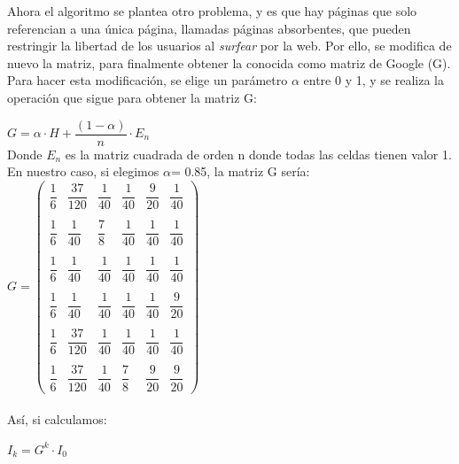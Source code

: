\documentclass[a4paper]{article}
\begin{document}
Ahora el algoritmo se plantea otro problema, y es que hay páginas que solo referencian a una única página, llamadas páginas absorbentes, que pueden restringir la libertad de los usuarios al \textit{surfear} por la web. Por ello, se modifica de nuevo la matriz, para finalmente obtener la conocida como matriz de Google (G).\\

Para hacer esta modificación, se elige un parámetro $\alpha$ entre 0 y 1, y se realiza la operación que sigue para obtener la matriz G:


\hspace{5cm}$G=\alpha \cdot H + \dfrac{(1-\alpha)}{n} \cdot E_n$\\

Donde $E_n$ es la matriz cuadrada de orden n donde todas las celdas tienen valor 1.\\

En nuestro caso, si elegimos $\alpha$= 0.85, la matriz G sería:\\


\hspace{5cm}$G=\begin{pmatrix}
   \dfrac{1}{6} & \dfrac{37}{120} & \dfrac{1}{40} & \dfrac{1}{40} & \dfrac{9}{20} & \dfrac{1}{40}\\ \\
   \dfrac{1}{6} & \dfrac{1}{40} & \dfrac{7}{8} & \dfrac{1}{40} & \dfrac{1}{40} & \dfrac{1}{40}\\ \\
   \dfrac{1}{6} & \dfrac{1}{40} & \dfrac{1}{40} & \dfrac{1}{40} & \dfrac{1}{40} & \dfrac{1}{40}\\\\
   \dfrac{1}{6} & \dfrac{1}{40} & \dfrac{1}{40} & \dfrac{1}{40} & \dfrac{1}{40} & \dfrac{9}{20}\\\\
   \dfrac{1}{6} & \dfrac{37}{120} & \dfrac{1}{40} & \dfrac{1}{40} & \dfrac{1}{40} & \dfrac{1}{40}\\\\
   \dfrac{1}{6} & \dfrac{37}{120} & \dfrac{1}{40} & \dfrac{7}{8} & \dfrac{9}{20} & \dfrac{9}{20}
\end{pmatrix}$\\
\\


Así, si calculamos:

\hspace{5cm}$I_k= G^k \cdot I_0$\\
\end{document}
